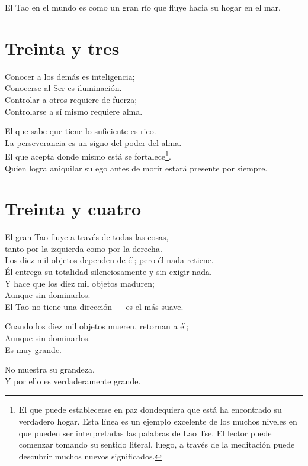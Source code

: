 \documentclass[book,b5paper,hidelinks,final]{memoir}
\begin{document}
	El Tao en el mundo es como un gran río que fluye hacia su hogar en el
	mar.
	
	\chapter*{Treinta y tres}
	
	Conocer a los demás es inteligencia;\\
	Conocerse al Ser es iluminación.\\
	Controlar a otros requiere de fuerza;\\
	Controlarse a sí mismo requiere alma.
	
	El que sabe que tiene lo suficiente es rico.\\
	La perseverancia es un signo del poder del alma.\\
	El que acepta donde mismo está se fortalece\footnote{El que puede establecerse en paz dondequiera que está ha encontrado su
		verdadero hogar. Esta línea es un ejemplo excelente de los muchos
		niveles en que pueden ser interpretadas las palabras de Lao Tse. El
		lector puede comenzar tomando su sentido literal, luego, a través de la
		meditación puede descubrir muchos nuevos significados.}.\\
	Quien logra aniquilar su ego antes de morir estará presente por siempre.
	
	\chapter*{Treinta y cuatro}
	
	El gran Tao fluye a través de todas las cosas,\\
	tanto por la izquierda como por la derecha.\\
	Los diez mil objetos dependen de él; pero él nada retiene.\\
	Él entrega su totalidad silenciosamente y sin exigir nada.\\
	Y hace que los diez mil objetos maduren;\\
	Aunque sin dominarlos.\\
	El Tao no tiene una dirección --- es el más suave.
	
	Cuando los diez mil objetos mueren, retornan a él;\\
	Aunque sin dominarlos.\\
	Es muy grande.
	
	No muestra su grandeza,\\
	Y por ello es verdaderamente grande.
	
\end{document}
